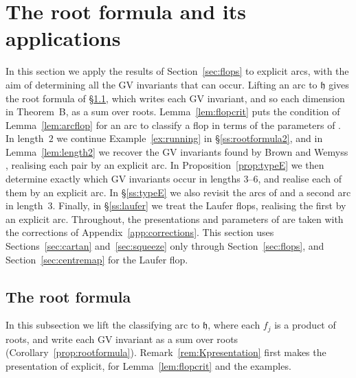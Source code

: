 \documentclass[11pt]{amsart}
\numberwithin{table}{section}
\numberwithin{figure}{section}
\numberwithin{equation}{section}
\theoremstyle{definition}
\theoremstyle{plain}
\newcommand{\h}{\mathfrak{h}}
\begin{document}
%
\section{The root formula and its applications}\label{sec:examples}

In this section we apply the results of Section~\ref{sec:flops} to explicit arcs, with the aim of determining all the GV invariants that can occur. Lifting an arc to $\h$ gives the root formula of \S\ref{ss:rootformula}, which writes each GV invariant, and so each dimension in Theorem~B, as a sum over roots. Lemma~\ref{lem:flopcrit} puts the condition of Lemma~\ref{lem:arcflop} for an arc to classify a flop in terms of the parameters of \cite{K}. In length~$2$ we continue Example~\ref{ex:running} in \S\ref{ss:rootformula2}, and in Lemma~\ref{lem:length2} we recover the GV invariants found by Brown and Wemyss \cite[Cor~8.13]{BW}, realising each pair by an explicit arc. In Proposition~\ref{prop:typeE} we then determine exactly which GV invariants occur in lengths $3$--$6$, and realise each of them by an explicit arc. In \S\ref{ss:typeE} we also revisit the arcs of \cite[Examples~5.3--5.5]{K} and a second arc in length~$3$. Finally, in \S\ref{ss:laufer} we treat the Laufer flops, realising the first by an explicit arc. Throughout, the presentations and parameters of \cite{K} are taken with the corrections of Appendix~\ref{app:corrections}. This section uses Sections~\ref{sec:cartan} and~\ref{sec:squeeze} only through Section~\ref{sec:flops}, and Section~\ref{sec:centremap} for the Laufer flop.

\subsection{The root formula}\label{ss:rootformula}

In this subsection we lift the classifying arc to $\h$, where each $f_j$ is a product of roots, and write each GV invariant as a sum over roots (Corollary~\ref{prop:rootformula}). Remark~\ref{rem:Kpresentation} first makes the presentation of \cite{K} explicit, for Lemma~\ref{lem:flopcrit} and the examples.
\end{document}
